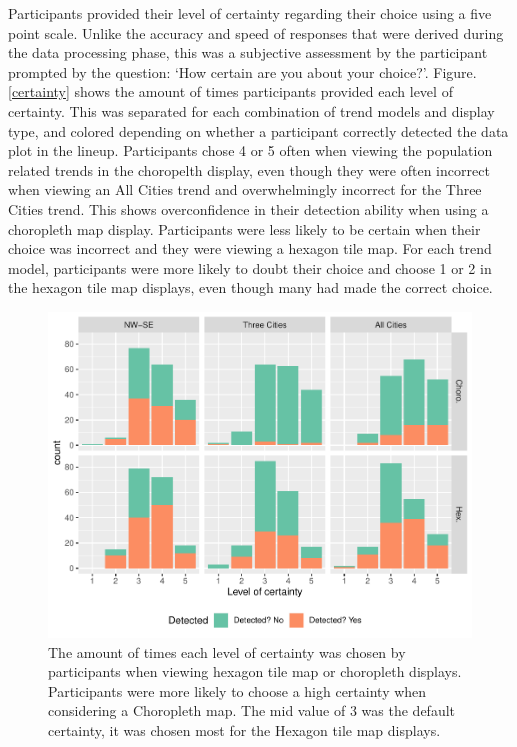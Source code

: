 \documentclass[conference,final,]{IEEEtran}
\makeatletter
\def\maxwidth{\ifdim\Gin@nat@width>\linewidth\linewidth
\else\Gin@nat@width\fi}
\let\Oldincludegraphics\includegraphics
\renewcommand{\includegraphics}[1]{\Oldincludegraphics[width=\maxwidth]{#1}}
\makeatother
\begin{document}
Participants provided their level of certainty regarding their choice using a five point scale.
Unlike the accuracy and speed of responses that were derived during the data processing phase, this was a subjective
assessment by the participant prompted by the question: `How certain are you about your choice?'.
Figure. \ref{certainty} shows the amount of times participants provided each level of certainty. This was separated for each combination of trend models and display type, and colored depending on whether a participant correctly detected the data plot in the lineup.
Participants chose 4 or 5 often when viewing the population related trends in the choropelth display, even though they were often incorrect when viewing an All Cities trend and overwhelmingly incorrect for the Three Cities trend. This shows overconfidence in their detection ability when using a choropleth map display. Participants were less likely to be certain when their choice was incorrect and they were viewing a hexagon tile map.
For each trend model, participants were more likely to doubt their choice and choose 1 or 2 in the hexagon tile map displays, even though many had made the correct choice.

\begin{figure}
\centering
\includegraphics{paper_files/figure-latex/certainty-1.pdf}
\caption{\label{fig:certainty}The amount of times each level of certainty was chosen by participants when viewing hexagon tile map or choropleth displays. Participants were more likely to choose a high certainty when considering a Choropleth map. The mid value of 3 was the default certainty, it was chosen most for the Hexagon tile map displays.}
\end{figure}
\end{document}
